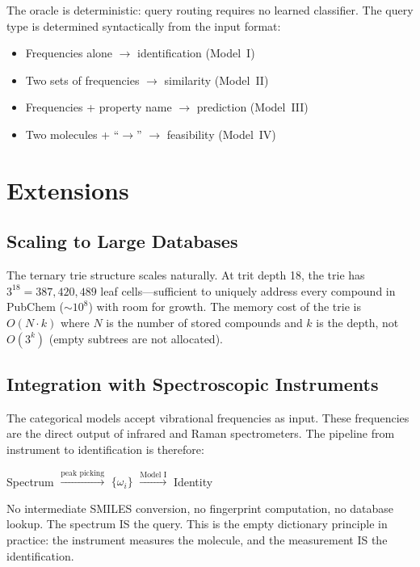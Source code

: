 \documentclass[11pt,twocolumn,a4paper]{article}
\theoremstyle{definition}
\theoremstyle{remark}
\begin{document}
The oracle is deterministic: query routing requires no learned classifier. The query type is determined syntactically from the input format:
\begin{itemize}[nosep]
\item Frequencies alone $\to$ identification (Model~I)
\item Two sets of frequencies $\to$ similarity (Model~II)
\item Frequencies + property name $\to$ prediction (Model~III)
\item Two molecules + ``$\to$'' $\to$ feasibility (Model~IV)
\end{itemize}


\section{Extensions}
\label{sec:extensions}

\subsection{Scaling to Large Databases}

The ternary trie structure scales naturally. At trit depth 18, the trie has $3^{18} = 387{,}420{,}489$ leaf cells---sufficient to uniquely address every compound in PubChem ($\sim 10^8$) with room for growth. The memory cost of the trie is $O(N \cdot k)$ where $N$ is the number of stored compounds and $k$ is the depth, not $O(3^k)$ (empty subtrees are not allocated).

\subsection{Integration with Spectroscopic Instruments}

The categorical models accept vibrational frequencies as input. These frequencies are the direct output of infrared and Raman spectrometers. The pipeline from instrument to identification is therefore:

\begin{center}
Spectrum $\xrightarrow{\text{peak picking}}$ $\{\omega_i\}$ $\xrightarrow{\text{Model I}}$ Identity
\end{center}

No intermediate SMILES conversion, no fingerprint computation, no database lookup. The spectrum IS the query. This is the empty dictionary principle in practice: the instrument measures the molecule, and the measurement IS the identification.
\end{document}
